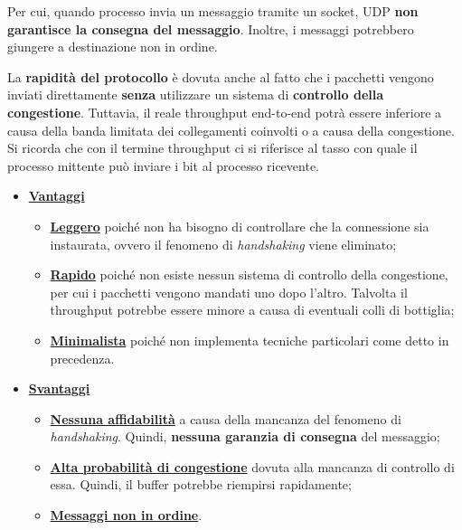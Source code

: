 \documentclass[a4paper]{article}
\begin{document}
	\noindent
	Per cui, quando processo invia un messaggio tramite un socket, UDP \textbf{non garantisce la consegna del messaggio}. Inoltre, i messaggi potrebbero giungere a destinazione non in ordine.\newline
	
	\noindent
	La \textbf{rapidità del protocollo} è dovuta anche al fatto che i pacchetti vengono inviati direttamente \textbf{senza} utilizzare un sistema di \textbf{controllo della congestione}. Tuttavia, il reale throughput end-to-end potrà essere inferiore a causa della banda limitata dei collegamenti coinvolti o a causa della congestione. Si ricorda che con il termine throughput ci si riferisce al tasso con quale il processo mittente può inviare i bit al processo ricevente.
	
	\begin{itemize}
		\item \textcolor{Green4}{\textbf{\underline{Vantaggi}}}
		\begin{itemize}
			\item \textbf{\underline{Leggero}} poiché non ha bisogno di controllare che la connessione sia instaurata, ovvero il fenomeno di \emph{handshaking} viene eliminato;
			
			\item \textbf{\underline{Rapido}} poiché non esiste nessun sistema di controllo della congestione, per cui i pacchetti vengono mandati uno dopo l'altro. Talvolta il throughput potrebbe essere minore a causa di eventuali colli di bottiglia;
			
			\item \textbf{\underline{Minimalista}} poiché non implementa tecniche particolari come detto in precedenza.
		\end{itemize}
		
		\item \textcolor{Red3}{\textbf{\underline{Svantaggi}}}
		\begin{itemize}
			\item \textbf{\underline{Nessuna affidabilità}} a causa della mancanza del fenomeno di \emph{handshaking}. Quindi, \textbf{nessuna garanzia di consegna} del messaggio;
			
			\item \textbf{\underline{Alta probabilità di congestione}} dovuta alla mancanza di controllo di essa. Quindi, il buffer potrebbe riempirsi rapidamente;
			
			\item \textbf{\underline{Messaggi non in ordine}}.
		\end{itemize}
	\end{itemize}
\end{document}
